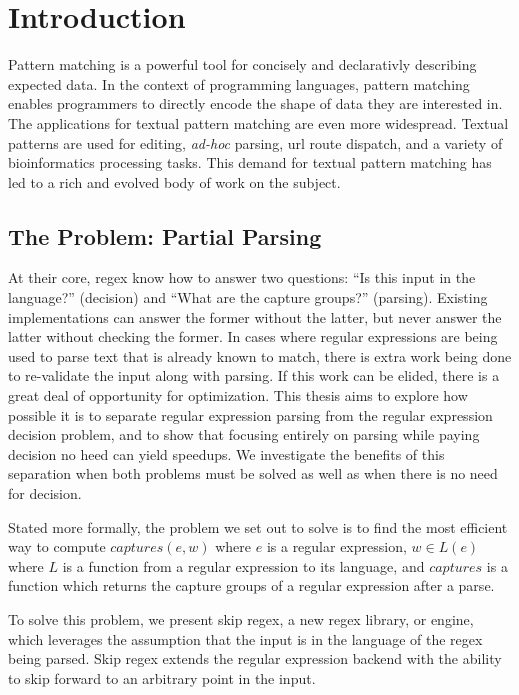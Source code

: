 \chapter{Introduction}
\label{chapter:introduction}

Pattern matching is a powerful tool for concisely and declarativly
describing expected data. In the context of programming languages,
pattern matching enables programmers to directly encode the shape
of data they are interested in. The applications for textual pattern
matching are even more widespread. Textual patterns are used for
editing, \textit{ad-hoc} parsing, url route dispatch, and a variety of
bioinformatics processing tasks. This demand for textual pattern
matching has led to a rich and evolved body of work on the subject.

\section{The Problem: Partial Parsing}

At their core, regex know how to answer two questions: ``Is this
input in the language?'' (decision) and ``What are the capture
groups?'' (parsing). Existing implementations can answer the former
without the latter, but never answer the latter without checking
the former. In cases where regular expressions are being used to
parse text that is already known to match, there is extra work being done
to re-validate the input along with parsing. If this work can be
elided, there is a great deal of opportunity for optimization.
This thesis aims to explore how possible it is to separate regular
expression parsing from the regular expression decision problem,
and to show that focusing entirely on parsing while paying decision
no heed can yield speedups. We investigate the benefits of this
separation when both problems must be solved as well as when
there is no need for decision.

Stated more formally, the problem we set out to solve is to find
the most efficient way to compute $captures(e, w)$ where $e$ is
a regular expression, $w \in L(e)$ where $L$ is a function from
a regular expression to its language, and $captures$ is a function
which returns the capture groups of a regular expression after
a parse.

To solve this problem, we present skip regex, a new regex library,
or engine, which leverages the assumption that the input is in the language
of the regex being parsed. Skip regex extends the regular expression
backend with the ability to skip forward to an arbitrary point in the
input.

